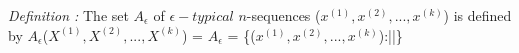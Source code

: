 \documentclass[preview]{standalone}
\begin{document}
\begin{center}
\textit{Definition :} The set $A_{\epsilon}$ of $\epsilon -typical$ $n$-sequences ($x^{(1)},x^{(2)},...,x^{(k)}$) is defined by $A_{\epsilon}$($X^{(1)},X^{(2)},...,X^{(k)}$) = $A_{\epsilon}$ = \{($x^{(1)},x^{(2)},...,x^{(k)}$):||\}
\end{center}
\end{document}
